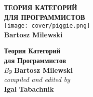 


\thispagestyle{empty}
\begin{center}
\begin{minipage}{\textwidth}
\centering
\fontsize{28pt}{34pt}\selectfont
\textbf{ТЕОРИЯ КАТЕГОРИЙ}\\[0.2cm]
\fontsize{28pt}{34pt}\selectfont
\textbf{ДЛЯ ПРОГРАММИСТОВ}\\[1.2cm]

\texttt{[image: cover/piggie.png]}\\[1.2cm]

\fontsize{18pt}{24pt}\selectfont
\textbf{Bartosz Milewski}

\end{minipage}
\vspace*{\fill}
\end{center}

\clearpage

\thispagestyle{empty}

\vspace*{80pt}

\begin{raggedleft}
  \fontsize{24pt}{24pt}\selectfont
  \textbf{Теория Категорий \\ для Программистов}\\
  \ifdefined{}
  \fi
  \vspace*{1cm}
  \fontsize{16pt}{18pt}\selectfont \textit{By } \textbf{Bartosz Milewski}\\
  \vspace{1cm}
  \fontsize{12pt}{14pt}\selectfont \textit{compiled and edited by}\\ \textbf{Igal Tabachnik}\\

\end{raggedleft}


\newpage

\vspace*{0.3\textheight}
\thispagestyle{empty}

